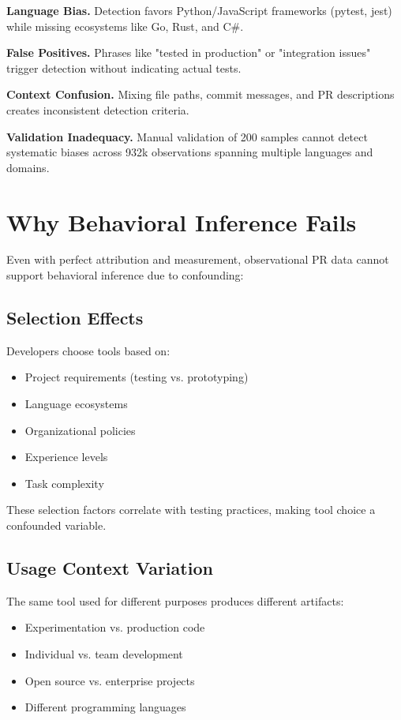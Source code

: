 \documentclass[conference]{IEEEtran}
\begin{document}
\textbf{Language Bias.} Detection favors Python/JavaScript frameworks (pytest, jest) while missing ecosystems like Go, Rust, and C\#.

\textbf{False Positives.} Phrases like "tested in production" or "integration issues" trigger detection without indicating actual tests.

\textbf{Context Confusion.} Mixing file paths, commit messages, and PR descriptions creates inconsistent detection criteria.

\textbf{Validation Inadequacy.} Manual validation of 200 samples cannot detect systematic biases across 932k observations spanning multiple languages and domains.

\section{Why Behavioral Inference Fails}
Even with perfect attribution and measurement, observational PR data cannot support behavioral inference due to confounding:

\subsection{Selection Effects}
Developers choose tools based on:
\begin{itemize}
\item Project requirements (testing vs. prototyping)
\item Language ecosystems  
\item Organizational policies
\item Experience levels
\item Task complexity
\end{itemize}

These selection factors correlate with testing practices, making tool choice a confounded variable.

\subsection{Usage Context Variation}
The same tool used for different purposes produces different artifacts:
\begin{itemize}
\item Experimentation vs. production code
\item Individual vs. team development
\item Open source vs. enterprise projects
\item Different programming languages
\end{itemize}
\end{document}
